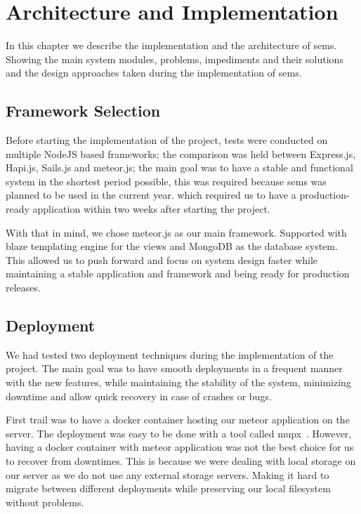 \chapter{Architecture and Implementation}
\label{chap:architecture_and_implementation}

In this chapter we describe the implementation and the architecture of \ac{sems}. Showing the main system modules,
problems, impediments and their solutions and the design approaches taken during the implementation of \ac{sems}.

\section{Framework Selection}
\label{sec:framework_selection}
Before starting the implementation of the project, tests were conducted on multiple NodeJS based frameworks; the comparison was held between
Express.js, Hapi.js, Sails.js and meteor.js; the main goal was to have a stable and functional system in the shortest period possible, this was
required because \ac{sems} was planned to be used in the current year. which required us to have a production-ready application within two weeks
after starting the project.

\newParagraph
With that in mind, we chose meteor.js as our main framework. Supported with blaze templating engine for the views and MongoDB as the
database system. This allowed us to push forward and focus on system design faster while maintaining a stable application and framework and
being ready for production releases.

\section{Deployment}
\label{sec:deployment}
We had tested two deployment techniques during the implementation of the project. The main goal was to have smooth deployments in a frequent
manner with the new features, while maintaining the stability of the system, minimizing downtime and allow quick recovery in case of crashes or bugs.

\newParagraph
First trail was to have a docker container hosting our meteor application on the server. The deployment was easy to be done with a tool
called mupx~\cite{mupx}. However, having a docker container with meteor application was not the best choice for us to recover from downtimes.
This is because we were dealing with local storage on our server as we do not use any external storage servers. Making it hard to migrate between
different deployments while preserving our local filesystem without problems.

